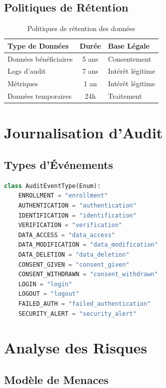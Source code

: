 \documentclass[12pt,a4paper]{report}
\begin{document}
\subsection{Politiques de Rétention}

\begin{table}[H]
    \centering
    \caption{Politiques de rétention des données}
    \label{tab:retention}
    \begin{tabular}{|l|c|l|}
        \hline
        \textbf{Type de Données} & \textbf{Durée} & \textbf{Base Légale} \\
        \hline
        Données bénéficiaires & 5 ans & Consentement \\
        \hline
        Logs d'audit & 7 ans & Intérêt légitime \\
        \hline
        Métriques & 1 an & Intérêt légitime \\
        \hline
        Données temporaires & 24h & Traitement \\
        \hline
    \end{tabular}
\end{table}

\section{Journalisation d'Audit}

\subsection{Types d'Événements}

\begin{lstlisting}[caption={Types d'événements d'audit},language=Python]
class AuditEventType(Enum):
    ENROLLMENT = "enrollment"
    AUTHENTICATION = "authentication"
    IDENTIFICATION = "identification"
    VERIFICATION = "verification"
    DATA_ACCESS = "data_access"
    DATA_MODIFICATION = "data_modification"
    DATA_DELETION = "data_deletion"
    CONSENT_GIVEN = "consent_given"
    CONSENT_WITHDRAWN = "consent_withdrawn"
    LOGIN = "login"
    LOGOUT = "logout"
    FAILED_AUTH = "failed_authentication"
    SECURITY_ALERT = "security_alert"
\end{lstlisting}

\section{Analyse des Risques}

\subsection{Modèle de Menaces}
\end{document}
